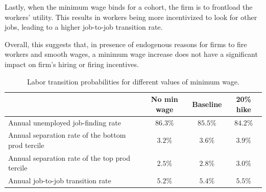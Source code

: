 Lastly, when the minimum wage binds for a cohort, the firm is to frontload the workers' utility. This results in workers being more incentivized to look for other jobs, leading to a higher job-to-job transition rate.

Overall, this suggests that, in presence of endogenous reasons for firms to fire workers and smooth wages, a minimum wage increase does not have a significant impact on firm's hiring or firing incentives.


\begin{table}[t!]
    \centering
    \begin{tabular}{lccc}
    \hline
                        & No min wage & Baseline & 20\% hike \\
    \hline
    \hline
    Annual unemployed job-finding rate    & $86.3\%$    & $85.5\%$  &   $84.2\%$                         \\
    \hline
    Annual separation rate of the bottom prod tercile & $3.2\%$  &  $3.6\%$  &  $3.9\%$ \\
    \hline
    Annual separation rate of the top prod tercile & $2.5\%$   &  $2.8\%$ &  $3.0\%$     \\
    \hline
    Annual job-to-job transition rate               &  $5.2\%$  & $5.4\%$  &  $5.5\%$    \\
    \hline
    \end{tabular}
    \caption{Labor transition probabilities for different values of minimum wage.}
    \label{tab:minwage_transitions}
\end{table}





